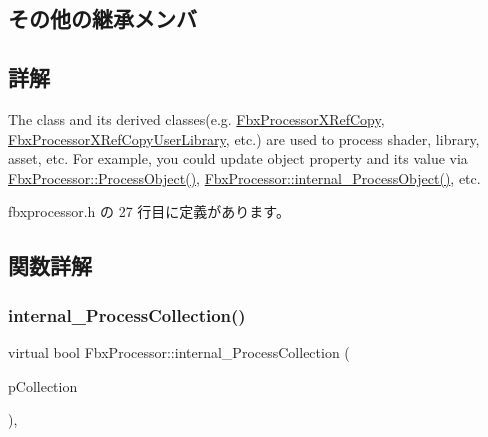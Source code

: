 \subsection*{その他の継承メンバ}


\subsection{詳解}
The class and its derived classes(e.\+g. \hyperlink{class_fbx_processor_x_ref_copy}{Fbx\+Processor\+X\+Ref\+Copy}, \hyperlink{class_fbx_processor_x_ref_copy_user_library}{Fbx\+Processor\+X\+Ref\+Copy\+User\+Library}, etc.) are used to process shader, library, asset, etc. For example, you could update object property and its value via \hyperlink{class_fbx_processor_adb5587b39465b31d968f1ba7dd2b2d5f}{Fbx\+Processor\+::\+Process\+Object()}, \hyperlink{class_fbx_processor_ac549e7e8c678383831be8789a7c4ccdb}{Fbx\+Processor\+::internal\+\_\+\+Process\+Object()}, etc. 

 fbxprocessor.\+h の 27 行目に定義があります。



\subsection{関数詳解}
\mbox{\label{class_fbx_processor_a0b0b24fc89c90b8cc6149df1360fbcbd}} 
\subsubsection{\texorpdfstring{internal\+\_\+\+Process\+Collection()}{internal\_ProcessCollection()}}
{\footnotesize\ttfamily virtual bool Fbx\+Processor\+::internal\+\_\+\+Process\+Collection (\begin{DoxyParamCaption}\item[{\hyperlink{class_fbx_collection}{Fbx\+Collection} $\ast$}]{p\+Collection }\end{DoxyParamCaption})\hspace{0.3cm}{\ttfamily [protected]}, {\ttfamily [virtual]}}

\mbox{\label{class_fbx_processor_aae65d06b0e0f7865eaaa803a4009d536}} 
